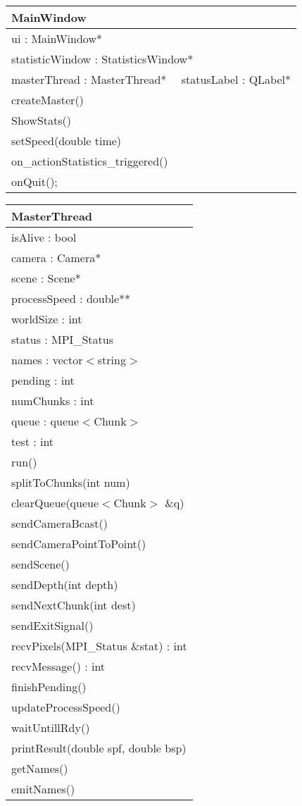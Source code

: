\begin{center}
    \begin{tabular}{|l|}
    \hline
    MainWindow  \\ \hline
    ui : MainWindow* \\
    statisticWindow : StatisticsWindow* \\
    masterThread : MasterThread* \ \
    statusLabel : QLabel* \\ \hline
    createMaster() \\
    ShowStats() \\
    setSpeed(double time) \\
    on\_actionStatistics\_triggered() \\
    onQuit(); \\ \hline
    \end{tabular}
\end{center}


\begin{center}
    \begin{tabular}{|l|}
    \hline
    MasterThread  \\ \hline
    isAlive : bool \\
    camera : Camera* \\
    scene : Scene* \\
    processSpeed : double** \\
    worldSize : int \\
    status : MPI\_Status \\
    names : vector$<$string$>$ \\
    pending : int \\
    numChunks : int \\
    queue : queue$<$Chunk$>$ \\
    test : int \\
    \hline
	run() \\
	splitToChunks(int num) \\
	clearQueue(queue$<$Chunk$>$ \&q) \\
    sendCameraBcast() \\
    sendCameraPointToPoint() \\
    sendScene() \\
    sendDepth(int depth) \\
    sendNextChunk(int dest) \\
    sendExitSignal() \\
    recvPixels(MPI\_Status \&stat) : int \\
    recvMessage() : int \\
    finishPending() \\
    updateProcessSpeed() \\
    waitUntillRdy() \\
    printResult(double spf, double bsp) \\
    getNames() \\
    emitNames() \\
	\hline
    \end{tabular}
\end{center}


